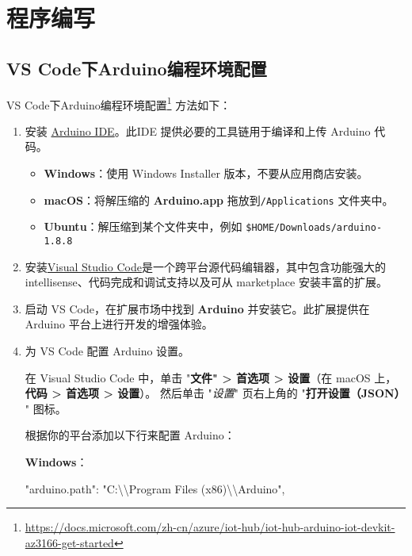 \chapter{程序编写}
\label{cha:Program}

\section{VS Code下Arduino编程环境配置}

VS Code下Arduino编程环境配置\footnote{\url{https://docs.microsoft.com/zh-cn/azure/iot-hub/iot-hub-arduino-iot-devkit-az3166-get-started}}
方法如下：

\begin{enumerate}

    \item
        安装 \href{https://www.arduino.cc/en/Main/Software}{Arduino IDE}。此IDE 提供必要的工具链用于编译和上传 Arduino 代码。
        
        \begin{itemize}
        \item
            \textbf{Windows}：使用 Windows Installer 版本，不要从应用商店安装。
        \item
            \textbf{macOS}：将解压缩的 \textbf{Arduino.app} 拖放到\texttt{/Applications} 文件夹中。
        \item
            \textbf{Ubuntu}：解压缩到某个文件夹中，例如 \texttt{\$HOME/Downloads/arduino-1.8.8}
        \end{itemize}
    \item
         安装\href{https://code.visualstudio.com/}{Visual Studio Code}是一个跨平台源代码编辑器，其中包含功能强大的intellisense、代码完成和调试支持以及可从 marketplace 安装丰富的扩展。
    \item
        启动 VS Code，在扩展市场中找到 \textbf{Arduino} 并安装它。此扩展提供在 Arduino 平台上进行开发的增强体验。
    \item
        为 VS Code 配置 Arduino 设置。
        
        在 Visual Studio Code 中，单击 "\textbf{文件" \textgreater{} 首选项 \textgreater{} 设置}（在 macOS 上，\textbf{代码 \textgreater{} 首选项 \textgreater{} 设置}）。 然后单击 "\emph{设置}" 页右上角的 "\textbf{打开设置（JSON）} " 图标。

        根据你的平台添加以下行来配置 Arduino：
    
        \textbf{Windows}：
        \begin{tcolorbox}
            "arduino.path": "C:\textbackslash{}\textbackslash{}Program Files (x86)\textbackslash{}\textbackslash{}Arduino",
        \end{tcolorbox}


\end{enumerate}

